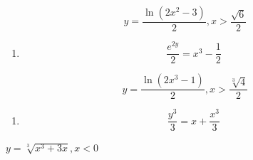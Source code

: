 \documentclass[
]{article}
\providecommand{\tightlist}{%
  \setlength{\itemsep}{0pt}\setlength{\parskip}{0pt}}
\begin{document}
\[y = \frac{\ln(2x^2 - 3)}{2}, x > \frac{\sqrt{6}}{2}\]

\begin{enumerate}
\def\labelenumi{\arabic{enumi})}
\setcounter{enumi}{10}
\tightlist
\item
  \[\frac{e^{2y}}{2} = x^3 - \frac{1}{2}\]
\end{enumerate}

\[y = \frac{\ln(2x^3 - 1)}{2}, x > \frac{\sqrt[3]{4}}{2}\]

\begin{enumerate}
\def\labelenumi{\arabic{enumi})}
\setcounter{enumi}{11}
\tightlist
\item
  \[\frac{y^3}{3} = x + \frac{x^3}{3}\]
\end{enumerate}

\(y = \sqrt[3]{x^3 + 3x}, x < 0\)
\end{document}
